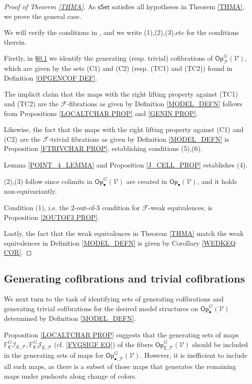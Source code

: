 \documentclass[a4paper,10pt
,draft
]{article}%
\numberwithin{equation}{section}
\numberwithin{figure}{section}
\theoremstyle{definition} %
\newcommand{\sSet}{\ensuremath{\mathsf{sSet}}}%
\newcommand{\Op}{\mathsf{Op}}%
\newcommand{\F}{\ensuremath{\mathcal F}}
\newcommand{\V}{\ensuremath{\mathcal V}}
\newcommand{\1}{\ensuremath{\mathbbm 1}}%
\begin{document}
\begin{proof}[Proof of Theorem \ref{THMA}]
      As $\sSet$ satisfies all 
      hypotheses in Theorem \ref{THMA}, we prove the general case.

      We will verify the conditions in 
\cite[Theorem 2.1.19]{Hov99}, and we write (1),(2),(3),etc for the conditions therein.

Firstly, in \S \ref{GENCOF SEC} we identify
the generating (resp. trivial) cofibrations of $\mathsf{Op}^G_{\F}(\V)$,
which are given by the sets 
(C1) and (C2) (resp. (TC1) and (TC2))
found in Definition \ref{OPGENCOF DEF}.

The implicit claim that the maps
with the right lifting property against 
(TC1) and (TC2)
are the $\F$-fibrations as given by 
Definition \ref{MODEL_DEFN}
follows from Propositions \ref{LOCALTCHAR PROP} and \ref{GENIN PROP}.

Likewise, the fact that the maps
with the right lifting property against 
(C1) and (C2) are the 
$\F$-trivial fibrations as given by 
Definition \ref{MODEL_DEFN}
is Proposition \ref{FTRIVCHAR PROP}, 
establishing conditions (5),(6).

Lemma \ref{POINT_4_LEMMA} and Proposition \ref{J_CELL_PROP} establishes (4).

(2),(3) follow since colimits in $\mathsf{Op}^G_\bullet(\V)$ are created in $\Op_{\bullet}(\V)$, and it holds non-equivariantly.

Condition (1), i.e. the $2$-out-of-$3$ condition for $\F$-weak equivalences, 
is Proposition \ref{2OUTOF3 PROP}.

Lastly, the fact that the weak equivalences in 
Theorem \ref{THMA}
match the weak equivalences in
Definition \ref{MODEL_DEFN} is given by 
Corollary \ref{WEDKEQ COR}.
\end{proof}





\subsection{Generating cofibrations and trivial cofibrations}
\label{GENCOF SEC}

We next turn to the task of identifying sets of generating cofibrations and generating trivial cofibrations
for the desired model structures
on $\mathsf{Op}^G_{\bullet}(\V)$ determined by Definition \ref{MODEL_DEFN}.


Proposition \ref{LOCALTCHAR PROP} suggests that
the generating sets of maps
$\mathbb{F}^G_{\mathfrak{C}} \mathcal{I}_{\mathfrak{C},\mathcal{F}},
\mathbb{F}^G_{\mathfrak{C}} \mathcal{J}_{\mathfrak{C},\mathcal{F}}$
(cf. \eqref{FVGSIGF EQ}) of the fibers 
$\mathsf{Op}^G_{\mathfrak{C},\F}(\V)$
should be included
in the generating sets of maps for 
$\mathsf{Op}^G_{\bullet,\F}(\V)$.
However, it is inefficient to include all such maps, 
as there is a subset of those maps
that generates the remaining maps under pushouts along change of colors.
\end{document}

